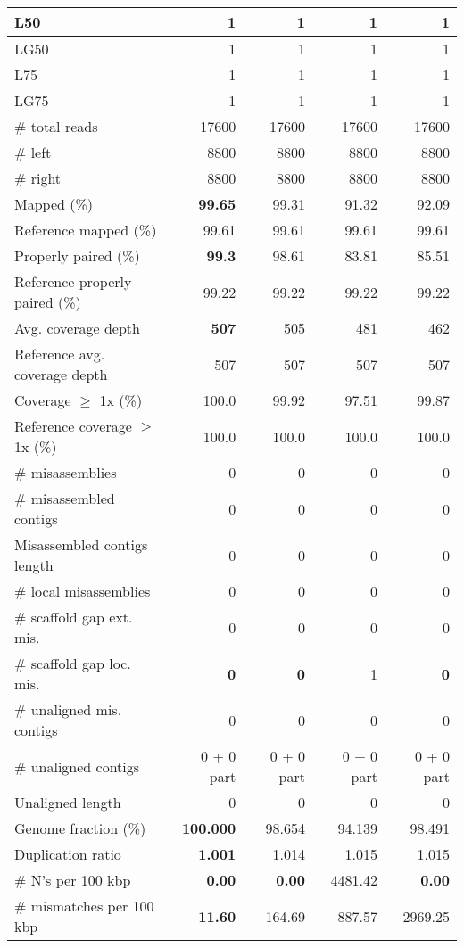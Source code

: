 \documentclass[12pt,a4paper]{article}
\begin{document}
\begin{table}[ht]
\begin{center}
\begin{tabular}{|l*{4}{|r}|}
L50 & 1 & 1 & 1 & 1 \\ \hline
LG50 & 1 & 1 & 1 & 1 \\ \hline
L75 & 1 & 1 & 1 & 1 \\ \hline
LG75 & 1 & 1 & 1 & 1 \\ \hline
\# total reads & 17600 & 17600 & 17600 & 17600 \\ \hline
\# left & 8800 & 8800 & 8800 & 8800 \\ \hline
\# right & 8800 & 8800 & 8800 & 8800 \\ \hline
Mapped (\%) & {\bf 99.65} & 99.31 & 91.32 & 92.09 \\ \hline
Reference mapped (\%) & 99.61 & 99.61 & 99.61 & 99.61 \\ \hline
Properly paired (\%) & {\bf 99.3} & 98.61 & 83.81 & 85.51 \\ \hline
Reference properly paired (\%) & 99.22 & 99.22 & 99.22 & 99.22 \\ \hline
Avg. coverage depth & {\bf 507} & 505 & 481 & 462 \\ \hline
Reference avg. coverage depth & 507 & 507 & 507 & 507 \\ \hline
Coverage $\geq$ 1x (\%) & 100.0 & 99.92 & 97.51 & 99.87 \\ \hline
Reference coverage $\geq$ 1x (\%) & 100.0 & 100.0 & 100.0 & 100.0 \\ \hline
\# misassemblies & 0 & 0 & 0 & 0 \\ \hline
\# misassembled contigs & 0 & 0 & 0 & 0 \\ \hline
Misassembled contigs length & 0 & 0 & 0 & 0 \\ \hline
\# local misassemblies & 0 & 0 & 0 & 0 \\ \hline
\# scaffold gap ext. mis. & 0 & 0 & 0 & 0 \\ \hline
\# scaffold gap loc. mis. & {\bf 0} & {\bf 0} & 1 & {\bf 0} \\ \hline
\# unaligned mis. contigs & 0 & 0 & 0 & 0 \\ \hline
\# unaligned contigs & 0 + 0 part & 0 + 0 part & 0 + 0 part & 0 + 0 part \\ \hline
Unaligned length & 0 & 0 & 0 & 0 \\ \hline
Genome fraction (\%) & {\bf 100.000} & 98.654 & 94.139 & 98.491 \\ \hline
Duplication ratio & {\bf 1.001} & 1.014 & 1.015 & 1.015 \\ \hline
\# N's per 100 kbp & {\bf 0.00} & {\bf 0.00} & 4481.42 & {\bf 0.00} \\ \hline
\# mismatches per 100 kbp & {\bf 11.60} & 164.69 & 887.57 & 2969.25 \\ \hline

\end{tabular}
\end{center}
\end{table}
\end{document}
